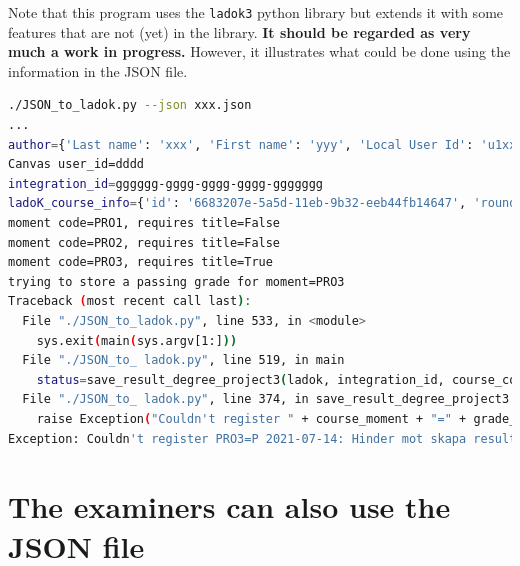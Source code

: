 Note that this program uses the \texttt{ladok3} python library but extends it with some features that are not (yet) in the library. \textbf{It should be regarded as very much a work in progress.} However, it illustrates what could be done using the information in the JSON file.
\begin{lstlisting}[language={bash},
    breaklines=true,
    breakatwhitespace=true,          % sets if automatic breaks should only happen at whitespace
    breakindent=0em,
    caption={Using the extracted JSON to produce a LADOK entry for a student in the DA231X degree project course}, label=lst:usingExtractedJSONtoProduceLADOKentry1]
./JSON_to_ladok.py --json xxx.json
...
author={'Last name': 'xxx', 'First name': 'yyy', 'Local User Id': 'u1xxxx', 'E-mail': 'oxxx@kth.se', 'organisation': {'L1': 'School of Electrical Engineering and Computer Science '}}
Canvas user_id=dddd
integration_id=gggggg-gggg-gggg-gggg-ggggggg
ladoK_course_info={'id': '6683207e-5a5d-11eb-9b32-eeb44fb14647', 'round_id': '8e15ae14-1d86-11ea-a622-3565135944de', 'education_id': '374ea085-73d8-11e8-afa7-8e408e694e54', 'instance_id': '8eee8da9-dd0a-11e8-bb7a-19f8cd1a470e', 'swe_name': 'Examensarbete i datalogi och datateknik, avancerad nivå', 'eng_name': 'Degree Project in Computer Science and Engineering, Second Cycle'}
moment code=PRO1, requires title=False
moment code=PRO2, requires title=False
moment code=PRO3, requires title=True
trying to store a passing grade for moment=PRO3
Traceback (most recent call last):
  File "./JSON_to_ladok.py", line 533, in <module>
    sys.exit(main(sys.argv[1:]))
  File "./JSON_to_ ladok.py", line 519, in main
    status=save_result_degree_project3(ladok, integration_id, course_code, mom['Utbildningskod'], '2021-07-14', 'P', "PF", main_title, alternative_main_title)
  File "./JSON_to_ ladok.py", line 374, in save_result_degree_project3
    raise Exception("Couldn't register " + course_moment + "=" + grade_raw + " " + result_date_raw + ": " + r.json()["Meddelande"])
Exception: Couldn't register PRO3=P 2021-07-14: Hinder mot skapa resultat påträffat: Rapporteringsrättighet saknas
\end{lstlisting}



\section{The examiners can also use the JSON file}

